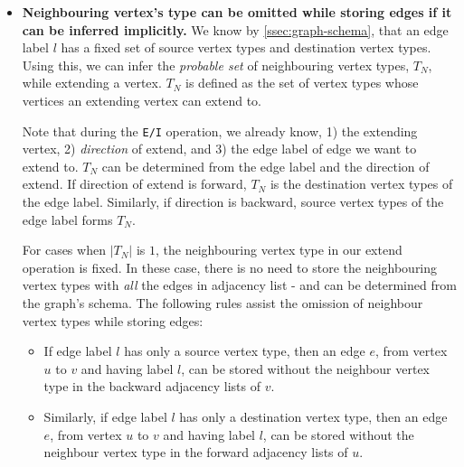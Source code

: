 \begin{itemize}
	\item \textbf{Neighbouring vertex's type can be omitted while storing edges if it can be inferred implicitly.} We know by \ref{ssec:graph-schema}, that an edge label $l$ has a fixed set of source vertex types and destination vertex types. Using this, we can infer the \emph{probable set} of neighbouring vertex types, $T_N$, while extending a vertex. $T_N$ is defined as the set of vertex types whose vertices an extending vertex can extend to.

	Note that during the \texttt{E/I} operation, we already know, 1) the extending vertex, 2) \emph{direction} of extend, and 3) the edge label of edge we want to extend to. $T_N$ can be determined from the edge label and the direction of extend. If direction of extend is forward, $T_N$ is the destination vertex types of the edge label. Similarly, if direction is backward, source vertex types of the edge label forms $T_N$. 
	
	For cases when $|T_N|$ is $1$, the neighbouring vertex type in our extend operation is fixed. In these case, there is no need to store the neighbouring vertex types with \emph{all} the edges in adjacency list - and can be determined from the graph's schema. The following rules assist the omission of neighbour vertex types while storing edges:
	
	\begin{itemize}
		\item If edge label $l$ has only a source vertex type, then an edge $e$, from vertex $u$ to $v$ and having label $l$, can be stored without the neighbour vertex type in the backward adjacency lists of $v$.
		
		\item Similarly, if edge label $l$ has only a destination vertex type, then an edge $e$, from vertex $u$ to $v$ and having label $l$, can be stored without the neighbour vertex type in the forward adjacency lists of $u$.
	\end{itemize}


\end{itemize}
